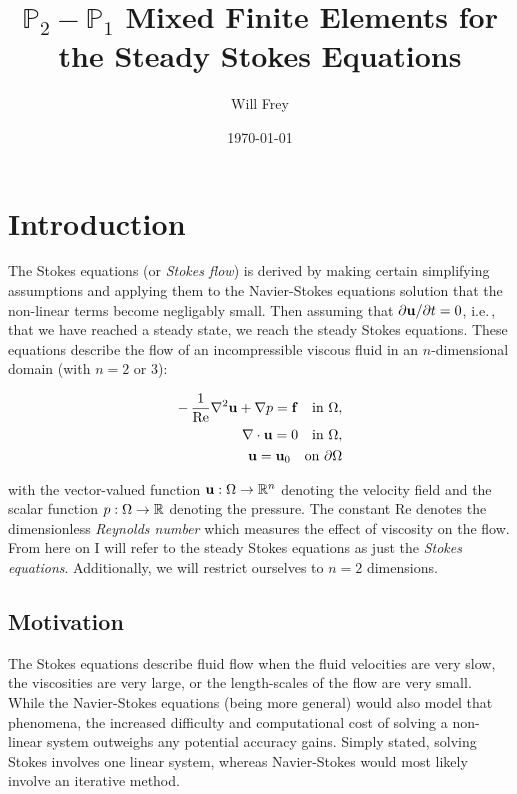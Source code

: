 \documentclass[12pt]{article}
\begin{document}
\title{$\mathbb{P}_2 - \mathbb{P}_1$ Mixed Finite Elements for the Steady
Stokes Equations}
\author{Will Frey}
\date{\today}
\maketitle


\section{Introduction}
The Stokes equations (or \textit{Stokes flow}) is derived by making certain
simplifying assumptions and applying them to the Navier-Stokes equations
solution that the non-linear terms become negligably small. Then assuming that
$\partial \mathbf{u} / \partial t = 0$, i.e.$\,$, that we have reached a steady state, we reach
the steady Stokes equations.  These equations describe the flow of an
incompressible viscous fluid in an $n$-dimensional domain (with $n = 2$ or
$3$):

\begin{equation}
    \begin{split}
        -\,\frac{1}{\text{Re}}\nabla^2 \mathbf{u} + \nabla p = \mathbf{f} \quad
        \text{in } \Omega, \\
        \nabla \cdot \mathbf{u} = 0 \quad \text{in } \Omega, \\
        \mathbf{u} = \mathbf{u}_0 \quad \text{on } \partial \Omega
    \end{split}
\end{equation}

with the vector-valued function $\mathbf{u}: \Omega \to \mathbb{R}^n$ denoting the
velocity field and the scalar function $p: \Omega \to \mathbb{R}$ denoting the
pressure\cite{br}. The constant $\text{Re}$ denotes the dimensionless
\textit{Reynolds number} which measures the effect of viscosity on the
flow\cite{vp}. From here on I will refer to the steady Stokes equations as just
the \textit{Stokes equations}. Additionally, we will restrict ourselves to $n =
2$ dimensions.

\subsection{Motivation}
The Stokes equations describe fluid flow when the fluid velocities
are very slow, the viscosities are very large, or the length-scales of the flow
are very small. While the Navier-Stokes equations (being more general) would
also model that phenomena, the increased difficulty and computational cost of
solving a non-linear system outweighs any potential accuracy gains. Simply
stated, solving Stokes involves one linear system, whereas Navier-Stokes would
most likely involve an iterative method.
\end{document}
